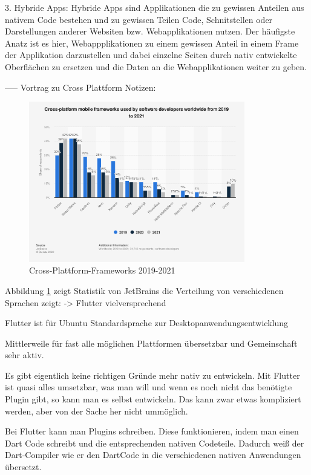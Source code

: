 3. Hybride Apps:
Hybride Apps sind Applikationen die zu gewissen Anteilen aus nativem Code bestehen und zu gewissen Teilen Code, Schnitstellen oder Darstellungen anderer Websiten bzw. Webapplikationen nutzen. Der häufigste Anatz ist es hier, Webappplikationen zu einem gewissen Anteil in einem Frame der Applikation darzustellen und dabei einzelne Seiten durch nativ entwickelte Oberflächen zu ersetzen und die Daten an die Webapplikationen weiter zu geben. 



-----
Vortrag zu Cross Plattform Notizen:

\begin{figure}[h]
  \centering
  \includegraphics[height=7cm,keepaspectratio]{images/cross-platform-mobile-frameworks.png} 
  \caption{Cross-Plattform-Frameworks 2019-2021}
  \label{fig:statista_cross_plattform}
\end{figure}

Abbildung \ref{fig:statista_cross_plattform} zeigt Statistik von JetBrains die Verteilung von verschiedenen Sprachen zeigt:
 -> Flutter vielversprechend
 
Flutter ist für Ubuntu Standardsprache zur Desktopanwendungsentwicklung

Mittlerweile für fast alle möglichen Plattformen übersetzbar und Gemeinschaft sehr aktiv.

Es gibt eigentlich keine richtigen Gründe mehr nativ zu entwickeln. Mit Flutter ist quasi alles umsetzbar, was man will und wenn es noch nicht das benötigte Plugin gibt, so kann man es selbst entwickeln. Das kann zwar etwas kompliziert werden, aber von der Sache her nicht ummöglich.

Bei Flutter kann man Plugins schreiben. Diese funktionieren, indem man einen Dart Code schreibt und die entsprechenden nativen Codeteile. Dadurch weiß der Dart-Compiler wie er den DartCode in die verschiedenen nativen Anwendungen übersetzt.

